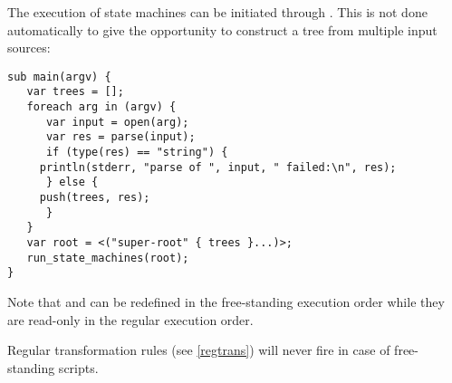 The execution
of state machines can be initiated through
. This is not
done automatically to give the opportunity to construct a tree from
multiple input sources:

\begin{lstlisting}
sub main(argv) {
   var trees = [];
   foreach arg in (argv) {
      var input = open(arg);
      var res = parse(input);
      if (type(res) == "string") {
	 println(stderr, "parse of ", input, " failed:\n", res);
      } else {
	 push(trees, res);
      }
   }
   var root = <("super-root" { trees }...)>;
   run_state_machines(root);
}
\end{lstlisting}

Note that  and  can be redefined in
the free-standing execution order while they are read-only
in the regular execution order.

Regular transformation rules (see \ref{regtrans})
will never fire in case of free-standing scripts.

\endinput
